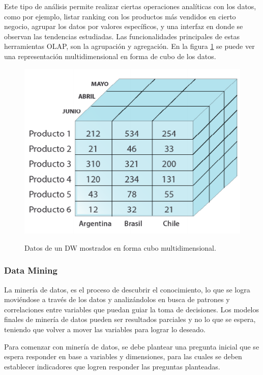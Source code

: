 \documentclass[letter,12pt,oneside]{report}
\begin{document}
Este tipo de análisis permite realizar ciertas operaciones analíticas con los datos, como por ejemplo, listar ranking con los productos más vendidos en cierto negocio, agrupar los datos por valores específicos, y una interfaz en donde se observan las tendencias estudiadas. Las funcionalidades principales de estas herramientas OLAP, son la agrupación y agregación. En la figura \ref{olap} se puede ver una representación multidimensional en forma de cubo de los datos.

\begin{figure}[h]
\begin{center}
\includegraphics[scale=0.6]{images/olap.png}
\caption{Datos de un DW mostrados en forma cubo multidimensional.}
\label{olap}
\end{center}
\end{figure}

\subsubsection{Data Mining}
La minería de datos, es el proceso de descubrir el conocimiento, lo que se logra moviéndose a través de los datos y analizándolos en busca de patrones y correlaciones entre variables que puedan guiar la toma de decisiones. Los modelos finales de minería de datos pueden ser resultados parciales y no lo que se espera, teniendo que volver a mover las variables para lograr lo deseado.

Para comenzar con minería de datos, se debe plantear una pregunta inicial que se espera responder en base a variables y dimensiones, para las cuales se deben establecer indicadores que logren responder las preguntas planteadas.
\end{document}
